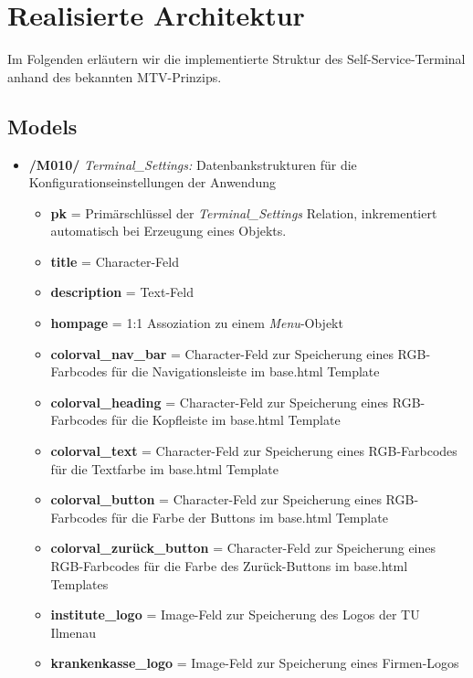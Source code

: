 \section{Realisierte Architektur}

Im Folgenden erläutern wir die implementierte Struktur des Self-Service-Terminal anhand des bekannten MTV-Prinzips.

\subsection{Models}
\begin{itemize}
    \item \textbf{/M010/} \textit{Terminal\_Settings:} Datenbankstrukturen für die Konfigurationseinstellungen der Anwendung
    \begin{itemize}
        \item \textbf{pk} = Primärschlüssel der \textit{Terminal\_Settings} Relation, inkrementiert automatisch bei Erzeugung eines Objekts.
        \item \textbf{title} = Character-Feld
        \item \textbf{description} = Text-Feld
        \item \textbf{hompage} = 1:1 Assoziation zu einem \textit{Menu}-Objekt
        \item \textbf{colorval\_nav\_bar} = Character-Feld zur Speicherung eines RGB-Farbcodes für die Navigationsleiste im base.html Template
        \item \textbf{colorval\_heading} = Character-Feld zur Speicherung eines RGB-Farbcodes für die Kopfleiste im base.html Template
        \item \textbf{colorval\_text} = Character-Feld zur Speicherung eines RGB-Farbcodes für die Textfarbe im base.html Template
        \item \textbf{colorval\_button} = Character-Feld zur Speicherung eines RGB-Farbcodes für die Farbe der Buttons im base.html Template
        \item \textbf{colorval\_zurück\_button} = Character-Feld zur Speicherung eines RGB-Farbcodes für die Farbe des Zurück-Buttons im base.html Templates
        \item \textbf{institute\_logo} = Image-Feld zur Speicherung des Logos der TU Ilmenau
        \item \textbf{krankenkasse\_logo} = Image-Feld zur Speicherung eines Firmen-Logos
    \end{itemize}
\end{itemize}
